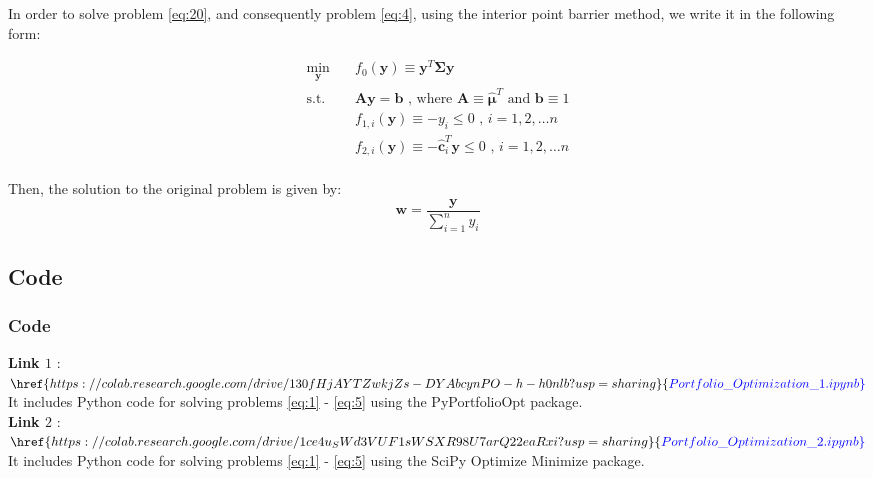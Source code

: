 \documentclass{beamer}
\begin{document}
\begin{frame}


\justifying
In order to solve problem \eqref{eq:20}, and consequently problem \eqref{eq:4}, using the interior point barrier method, we write it in the following form:

\justifying
\begin{equation}
\begin{aligned}
\label{eq:21}
\min_{\mathbf{y}} \quad & f_{0}\left(\mathbf{y}\right) \equiv \mathbf{y}^{T}\mathbf{\Sigma}\mathbf{y} \\
\textrm{s.t.} \quad & \mathbf{A} \mathbf{y} = \mathbf{b}  \textrm{ , where } \mathbf{A} \equiv \hat{\boldsymbol\mu}^{T} \textrm{ and } \mathbf{b} \equiv 1 \\
                             & f_{1,i}\left(\mathbf{y}\right) \equiv - y_{i} \leq 0 \textrm{ , } i = 1, 2, \dots n \\
                             & f_{2,i}\left(\mathbf{y}\right) \equiv -\hat{\mathbf{c}}_{i}^{T}\mathbf{y} \leq 0 \textrm{ , } i = 1, 2, \dots n \\
\end{aligned}
\end{equation}

\vspace{0.4cm}
\justifying
Then, the solution to the original problem is given by:
$$
\mathbf{w} = \frac{\mathbf{y}}{\sum_{i=1}^{n}y_{i}}
$$

\end{frame}








\subsection{Code}


\begin{frame}


\frametitle{\textbf{Code}}

\justifying
\textbf{Link $1$} :\\
$\href{https://colab.research.google.com/drive/130fHjAYTZwkjZs-DYAbcynPO-h-h0nlb?usp=sharing}{\color{blue}Portfolio\_Optimization\_1.ipynb}$\\
It includes Python code for solving problems \eqref{eq:1} - \eqref{eq:5} using the PyPortfolioOpt package.\\

\vspace{0.8cm}
\justifying
\textbf{Link $2$} :\\
$\href{https://colab.research.google.com/drive/1ce4u_SWd3VUF1sWSXR98U7arQ22eaRxi?usp=sharing}{\color{blue}Portfolio\_Optimization\_2.ipynb}$\\
It includes Python code for solving problems \eqref{eq:1} - \eqref{eq:5} using the SciPy Optimize Minimize package.\\



\end {frame}
\end{document}
